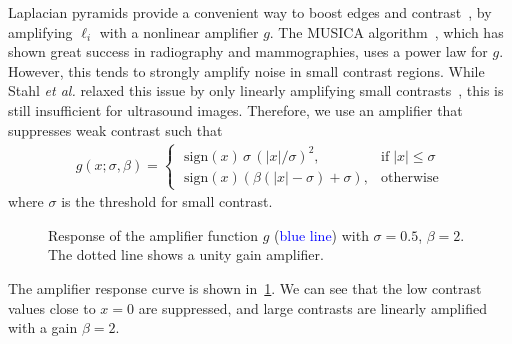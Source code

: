 Laplacian pyramids provide a convenient way to boost edges and contrast~\cite{vuylsteke_multiscale_1994, stahl_noiseresistant_1999, dippel_multiscale_2002}, by amplifying \({\boldsymbol\ell}_{i}\) with a nonlinear amplifier \(g\).
The MUSICA algorithm~\cite{vuylsteke_multiscale_1994}, which has shown great success in radiography and mammographies, uses a power law for \(g\).
However, this tends to strongly amplify noise in small contrast regions.
While Stahl \textit{et al.} relaxed this issue by only linearly amplifying small contrasts~\cite{stahl_noiseresistant_1999}, this is still insufficient for ultrasound images.
Therefore, we use an amplifier that suppresses weak contrast such that
\begin{align*}
  g\left(x; \sigma, \beta \right) =
  \begin{cases}
    \;\mathrm{sign}\left( x \right) \, \sigma \, {\left( |x|/\sigma \right)}^2, & \text{if}\; |x| \leq \sigma \\
    \;\mathrm{sign}\left( x \right) \left( \beta \left(|x| - \sigma \right) + \sigma \right), & \text{otherwise}
  \end{cases}
\end{align*}
where \(\sigma\) is the threshold for small contrast.
%
\begin{figure}[t]
  \vspace{-0.1in}
  \centering
  \caption{Response of the amplifier function \(g\) (\textcolor{blue}{blue line}) with \(\sigma=0.5\), \(\beta=2\).
  The dotted line shows a unity gain amplifier.}\label{fig:amp}
\end{figure}
%
The amplifier response curve is shown in~\cref{fig:amp}.
We can see that the low contrast values close to \(x=0\) are suppressed, and large contrasts are linearly amplified with a gain \(\beta=2\).


